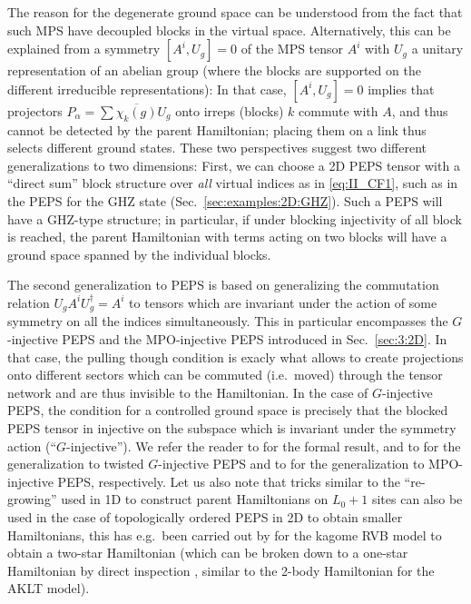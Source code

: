 \documentclass[rmp,aps,reprint,superscriptaddress,nobalancelastpage]{revtex4-1}
\begin{document}
The reason for the degenerate ground space can be understood from the fact that such MPS have decoupled blocks in the virtual space. Alternatively, this can be explained from a symmetry $[A^i,U_g]=0$ of the MPS tensor $A^i$ with $U_g$ a unitary representation of an abelian group (where the blocks are supported on the different irreducible representations): In that case, $[A^i,U_g]=0$ implies that projectors $P_\alpha=\sum \overline{\chi_k(g)} U_g$ onto irreps (blocks) $k$ commute with $A$, and thus cannot be detected by the parent Hamiltonian; placing them on a link thus selects different ground states. These two perspectives suggest two different generalizations to two dimensions: First, we can choose a 2D PEPS tensor with a ``direct sum'' block structure over \emph{all} virtual indices as in  \eqref{eq:II_CF1}, such as in the PEPS for the GHZ state (Sec.~\ref{sec:examples:2D:GHZ}).
Such a PEPS will have a GHZ-type structure; in particular, if under blocking injectivity of all block is reached, the parent Hamiltonian with terms acting on two blocks will have a ground space spanned by the individual blocks.

The second generalization to PEPS is based on generalizing the commutation relation $U_gA^iU_g^\dagger=A^i$ to tensors which are invariant under the action of some symmetry on all the indices simultaneously.  This in particular encompasses the $G$-injective PEPS and the MPO-injective PEPS introduced in Sec.~\ref{sec:3:2D}. In that case, the pulling though condition is exacly what allows to create projections onto different sectors which can be commuted (i.e.\ moved) through the tensor network and are thus invisible to the Hamiltonian.  In the case of $G$-injective PEPS, the condition for a controlled ground space is precisely that the blocked PEPS tensor in injective on the subspace which is invariant under the symmetry action (``$G$-injective'').  We refer the reader to  for the formal result, and to   for the generalization to twisted $G$-injective PEPS and to
 for the generalization to
MPO-injective PEPS, respectively. Let us also note that tricks similar to the ``re-growing'' used in 1D to construct parent Hamiltonians on $L_0+1$ sites can also be used in the case of topologically ordered PEPS in 2D to obtain smaller Hamiltonians, this has e.g.\ been carried out by \citet[][Appendix D]{schuch:rvb-kagome} for the kagome RVB model to obtain a two-star Hamiltonian (which can be broken down to a one-star Hamiltonian by direct inspection \cite{zhou:rvb-parent-onestar}, similar to the 2-body Hamiltonian for the AKLT model).
\end{document}
